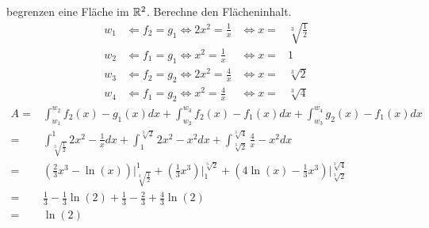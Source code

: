\documentclass{HM}
\begin{document}
\begin{enumerate}
		begrenzen eine Fläche im $\mathbb{R}^2$. Berechne den Flächeninhalt.
		\begin{align*}
		w_1 &\Leftarrow f_2=g_1 \Leftrightarrow 2x^2=\frac{1}{x}&\Leftrightarrow x=&\sqrt[3]{\frac{1}{2}}\\
		w_2 &\Leftarrow f_1=g_1 \Leftrightarrow x^2=\frac{1}{x}&\Leftrightarrow x=&1\\
		w_3 &\Leftarrow f_2=g_2 \Leftrightarrow 2x^2=\frac{4}{x}&\Leftrightarrow x=&\sqrt[3]{2}\\
		w_4 &\Leftarrow f_1=g_2\Leftrightarrow x^2=\frac{4}{x}&\Leftrightarrow x=&\sqrt[3]{4}
		\end{align*}
		\begin{align*}
		A=&\int_{w_1}^{w_2}f_2(x)-g_1(x)dx+\int_{w_2}^{w_3}f_2(x)-f_1(x)dx+\int_{w_3}^{w_4}g_2(x)-f_1(x)dx\\
		=&\int_{\sqrt[3]{\tfrac{1}{2}}}^{1}2x^2-\frac{1}{x}dx+\int_{1}^{\sqrt[3]{2}}2x^2-x^2dx+\int_{\sqrt[3]{2}}^{\sqrt[3]{4}}\frac{4}{x}-x^2dx\\
		=&\left(\frac{2}{3}x^3-\ln(x)\right)\biggr|_{\sqrt[3]{\tfrac{1}{2}}}^1+\left(\frac{1}{3}x^3\right)\biggr|_1^{\sqrt[3]{2}}+\left(4\ln(x)-\frac{1}{3}x^3\right)\biggr|_{\sqrt[3]{2}}^{\sqrt[3]{4}}\\
		=&\frac{1}{3}-\frac{1}{3}\ln(2)+\frac{1}{3}-\frac{2}{3}+\frac{4}{3}\ln(2)\\
		=&\ln(2)
		\end{align*}
		

\end{enumerate}
\end{document}
